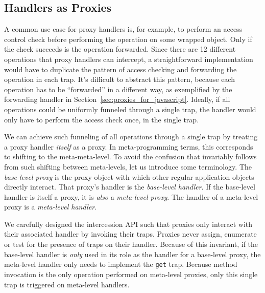 \documentclass{acm_proc_article-sp}
\begin{document}
\subsection{Handlers as Proxies}
\label{sub:doublelifting}

A common use case for proxy handlers is, for example, to perform an access control check before performing the operation on some wrapped object. Only if the check succeeds is the operation forwarded. Since there are 12 different operations that proxy handlers can intercept, a straightforward implementation would have to duplicate the pattern of access checking and forwarding the operation in each trap. It's difficult to abstract this pattern, because each operation has to be ``forwarded'' in a different way, as exemplified by the forwarding handler in Section~\ref{sec:proxies_for_javascript}. Ideally, if all operations could be uniformly funneled through a single trap, the handler would only have to perform the access check once, in the single trap.

We can achieve such funneling of all operations through a single trap by treating a proxy handler \emph{itself} as a proxy. In meta-programming terms, this corresponds to shifting to the meta-meta-level. To avoid the confusion that invariably follows from such shifting between meta-levels, let us introduce some terminology. The \emph{base-level proxy} is the proxy object with which other regular application objects directly interact. That proxy's handler is the \emph{base-level handler}. If the base-level handler is itself a proxy, it is \emph{also} a \emph{meta-level proxy}. The handler of a meta-level proxy is a \emph{meta-level handler}.

We carefully designed the intercession API such that proxies only interact with their associated handler by invoking their traps. Proxies never assign, enumerate or test for the presence of traps on their handler. Because of this invariant, if the base-level handler is \emph{only} used in its role as the handler for a base-level proxy, the meta-level handler only needs to implement the \texttt{get} trap. Because method invocation is the only operation performed on meta-level proxies, only this single trap is triggered on meta-level handlers.
\end{document}
